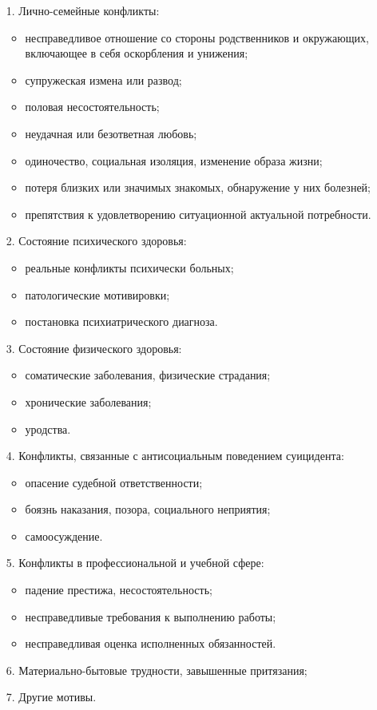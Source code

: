\begin{enumerate}
	\item[1.] Лично-семейные конфликты:
	\begin{itemize}
		\item несправедливое отношение со стороны родственников и окружающих, включающее в себя оскорбления и унижения;
		\item супружеская измена или развод;
		\item половая несостоятельность;
		\item неудачная или безответная любовь;
		\item одиночество, социальная изоляция, изменение образа жизни;
		\item потеря близких или значимых знакомых, обнаружение у них болезней;
		\item препятствия к удовлетворению ситуационной актуальной потребности.
	\end{itemize}

	\item[2.] Состояние психического здоровья:
	\begin{itemize}
		\item реальные конфликты психически больных;
		\item патологические мотивировки;
		\item постановка психиатрического диагноза.
	\end{itemize}

	\item[3.] Состояние физического здоровья:
	\begin{itemize}
		\item соматические заболевания, физические страдания;
		\item хронические заболевания;
		\item уродства.
	\end{itemize}

	\item[4.] Конфликты, связанные с антисоциальным поведением суицидента:
	\begin{itemize}
		\item опасение судебной ответственности;
		\item боязнь наказания, позора, социального неприятия;
		\item самоосуждение.
	\end{itemize}

	\item[5.] Конфликты в профессиональной и учебной сфере:
	\begin{itemize}
		\item падение престижа, несостоятельность;
		\item несправедливые требования к выполнению работы;
		\item несправедливая оценка исполненных обязанностей.
	\end{itemize}

	\item[6.] Материально-бытовые трудности, завышенные притязания;

	\item[7.] Другие мотивы.
\end{enumerate}

